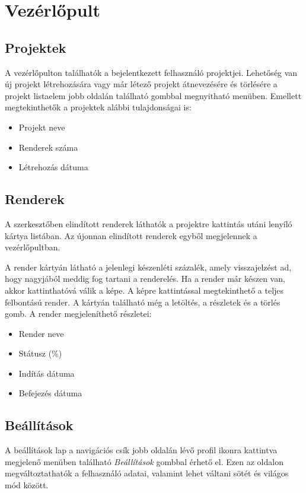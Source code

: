 \section{Vezérlőpult}


\subsection{Projektek}
A vezérlőpulton találhatók a bejelentkezett felhasználó projektjei. Lehetőség van új projekt létrehozására vagy már létező projekt átnevezésére és törlésére a projekt listaelem jobb oldalán található gombbal megnyitható menüben. Emellett megtekinthetők a projektek alábbi tulajdonságai is:
\begin{samepage}
  \begin{itemize}
    \item Projekt neve
    \item Renderek száma
    \item Létrehozás dátuma
  \end{itemize}
\end{samepage}

\subsection{Renderek}
A szerkesztőben elindított renderek láthatók a projektre kattintás utáni lenyíló kártya listában. Az újonnan elindított renderek egyből megjelennek a vezérlőpultban.

A render kártyán látható a jelenlegi készenléti százalék, amely visszajelzést ad, hogy nagyjából meddig fog tartani a renderelés. Ha a render már készen van, akkor kattinthatóvá válik a képe. A képre kattintással megtekinthető a teljes felbontású render. A kártyán található még a letöltés, a részletek és a törlés gomb. A render megjeleníthető részletei:
\begin{samepage}
  \begin{itemize}
    \item Render neve
    \item Státusz (\%)
    \item Indítás dátuma
    \item Befejezés dátuma
  \end{itemize}
\end{samepage}

\subsection{Beállítások}
A beállítások lap a navigációs csík jobb oldalán lévő profil ikonra kattintva megjelenő menüben található \emph{Beállítások} gombbal érhető el. Ezen az oldalon megváltoztathatók a felhasználó adatai, valamint lehet váltani sötét és világos mód között.